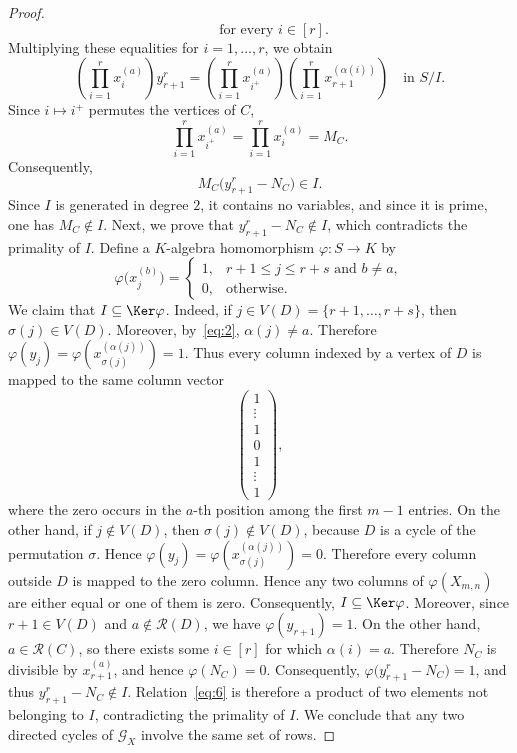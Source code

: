 \documentclass[12pt]{amsart}
\numberwithin{equation}{section}
\begin{document}
\begin{proof}
\[\qquad\text{for every }i\in[r].
\]
Multiplying these equalities for $i=1,\ldots,r$, we obtain
\[
\left(\prod_{i=1}^r x_i^{(a)}\right)y_{r+1}^r
=
\left(\prod_{i=1}^r x_{i^+}^{(a)}\right)
\left(\prod_{i=1}^r x_{r+1}^{(\alpha(i))}\right)
\quad\text{in }S/I.
\]
Since $i\mapsto i^+$ permutes the vertices of $C$,
\[
\prod_{i=1}^r x_{i^+}^{(a)}
=
\prod_{i=1}^r x_i^{(a)}
=
M_C.
\]
Consequently,
\begin{equation}\label{eq:6}
M_C\bigl(y_{r+1}^r-N_C\bigr)\in I.
\end{equation}
Since $I$ is generated in degree $2$, it contains no variables,
and since it is prime, one has $M_C\notin I$.
Next, we prove that $y_{r+1}^r-N_C\notin I$, which contradicts
the primality of $I$. Define a $K$-algebra homomorphism
$\varphi:S\longrightarrow K$ by
\begin{equation}\label{eq:7}
\varphi\bigl(x_j^{(b)}\bigr)=
\begin{cases}
1,
&
r+1\leq j\leq r+s
\text{ and }b\neq a,
\\[1mm]
0,
&
\text{otherwise}.
\end{cases}
\end{equation}
We claim that $I\subseteq\Ker\varphi$.
Indeed, if $j\in V(D)=\{r+1,\ldots,r+s\}$, then
$\sigma(j)\in V(D)$. Moreover, by~\eqref{eq:2},
$\alpha(j)\neq a$. Therefore
$\varphi(y_j)
=\varphi\left(x_{\sigma(j)}^{(\alpha(j))}\right)=1$.
Thus every column indexed by a vertex of $D$ is mapped to the same
column vector
\[
\begin{pmatrix}
1\\
\vdots\\
1\\
0\\
1\\
\vdots\\
1
\end{pmatrix},
\]
where the zero occurs in the $a$-th position among the first $m-1$
entries. On the other hand, if $j\notin V(D)$, then
$\sigma(j)\notin V(D)$, because $D$ is a cycle of the permutation
$\sigma$. Hence
$\varphi(y_j)
=\varphi\left(x_{\sigma(j)}^{(\alpha(j))}\right)=0$.
Therefore every column outside $D$ is mapped to the zero column.
Hence any two columns of $\varphi(X_{m,n})$ are either equal or
one of them is zero. Consequently, $I\subseteq\Ker\varphi$.
Moreover, since $r+1\in V(D)$ and $a\notin\mathcal R(D)$,
we have $\varphi(y_{r+1})=1$.
On the other hand, $a\in\mathcal R(C)$, so there exists some
$i\in[r]$ for which $\alpha(i)=a$. Therefore $N_C$ is divisible by
$x_{r+1}^{(a)}$, and hence $\varphi(N_C)=0$.
Consequently, $\varphi\bigl(y_{r+1}^r-N_C\bigr)=1$, and thus
$y_{r+1}^r-N_C\notin I$.
Relation~\eqref{eq:6} is therefore a product of two elements not
belonging to $I$, contradicting the primality of $I$.
We conclude that any two directed cycles of $\mathcal G_X$
involve the same set of rows.


\end{proof}
\end{document}
